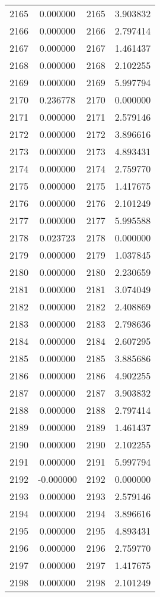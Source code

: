 \documentclass[12pt]{article}
\begin{document}
\begin{longtable}{@{}cccc@{}}
2165 & 0.000000 & 2165 & 3.903832 \\
2166 & 0.000000 & 2166 & 2.797414 \\
2167 & 0.000000 & 2167 & 1.461437 \\
2168 & 0.000000 & 2168 & 2.102255 \\
2169 & 0.000000 & 2169 & 5.997794 \\
2170 & 0.236778 & 2170 & 0.000000 \\
2171 & 0.000000 & 2171 & 2.579146 \\
2172 & 0.000000 & 2172 & 3.896616 \\
2173 & 0.000000 & 2173 & 4.893431 \\
2174 & 0.000000 & 2174 & 2.759770 \\
2175 & 0.000000 & 2175 & 1.417675 \\
2176 & 0.000000 & 2176 & 2.101249 \\
2177 & 0.000000 & 2177 & 5.995588 \\
2178 & 0.023723 & 2178 & 0.000000 \\
2179 & 0.000000 & 2179 & 1.037845 \\
2180 & 0.000000 & 2180 & 2.230659 \\
2181 & 0.000000 & 2181 & 3.074049 \\
2182 & 0.000000 & 2182 & 2.408869 \\
2183 & 0.000000 & 2183 & 2.798636 \\
2184 & 0.000000 & 2184 & 2.607295 \\
2185 & 0.000000 & 2185 & 3.885686 \\
2186 & 0.000000 & 2186 & 4.902255 \\
2187 & 0.000000 & 2187 & 3.903832 \\
2188 & 0.000000 & 2188 & 2.797414 \\
2189 & 0.000000 & 2189 & 1.461437 \\
2190 & 0.000000 & 2190 & 2.102255 \\
2191 & 0.000000 & 2191 & 5.997794 \\
2192 & -0.000000 & 2192 & 0.000000 \\
2193 & 0.000000 & 2193 & 2.579146 \\
2194 & 0.000000 & 2194 & 3.896616 \\
2195 & 0.000000 & 2195 & 4.893431 \\
2196 & 0.000000 & 2196 & 2.759770 \\
2197 & 0.000000 & 2197 & 1.417675 \\
2198 & 0.000000 & 2198 & 2.101249 \\

\end{longtable}
\end{document}
